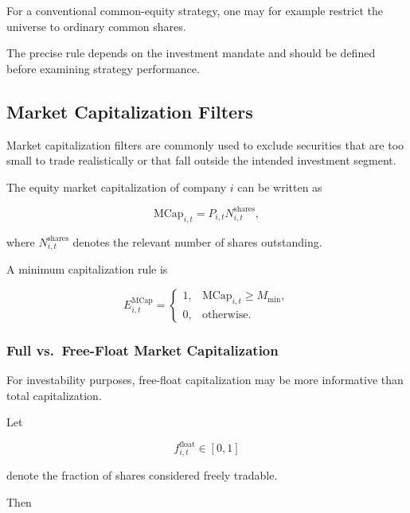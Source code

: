 \documentclass[11pt,a4paper]{article}
\begin{document}
For a conventional common-equity strategy, one may for example restrict the
universe to ordinary common shares.

The precise rule depends on the investment mandate and should be defined before
examining strategy performance.


\subsection{Market Capitalization Filters}
\label{subsec:market_capitalization_filters}

Market capitalization filters are commonly used to exclude securities that are
too small to trade realistically or that fall outside the intended investment
segment.

The equity market capitalization of company $i$ can be written as

\begin{equation}
\boxed{
\mathrm{MCap}_{i,t}
=
P_{i,t}
N_{i,t}^{\mathrm{shares}},
}
\end{equation}

where $N_{i,t}^{\mathrm{shares}}$ denotes the relevant number of shares
outstanding.

A minimum capitalization rule is

\begin{equation}
E_{i,t}^{\mathrm{MCap}}
=
\begin{cases}
1,
&
\mathrm{MCap}_{i,t}
\geq
M_{\min},
\\
0,
&
\text{otherwise}.
\end{cases}
\end{equation}


\subsubsection{Full vs.\ Free-Float Market Capitalization}

For investability purposes, free-float capitalization may be more informative
than total capitalization.

Let

\begin{equation}
f_{i,t}^{\mathrm{float}}
\in[0,1]
\end{equation}

denote the fraction of shares considered freely tradable.

Then
\end{document}
